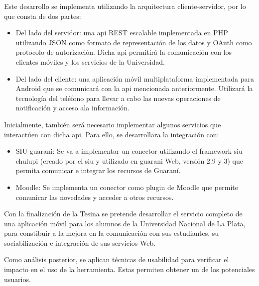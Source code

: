 Este desarrollo se implementa utilizando la arquitectura cliente-servidor, por lo que consta de dos partes:
\begin{itemize}
	\item Del lado del servidor: una \gls{api} REST escalable implementada en PHP utilizando JSON como formato de representación de los datos y OAuth como protocolo de autorización. Dicha \gls{api} permitirá la comunicación con los clientes móviles y los servicios de la Universidad.
	\item Del lado del cliente: una aplicación móvil multiplataforma implementada para Android que se comunicará con la \gls{api} mencionada anteriormente. Utilizará la tecnología del teléfono para llevar a cabo las nuevas operaciones de notificación y acceso ala información.
\end{itemize}

Inicialmente, también será necesario implementar algunos servicios que interactúen con dicha \gls{api}. Para ello, se desarrollara la integración con:
\begin{itemize}
	\item SIU \gls{guarani}: Se va a implementar un conector utilizando el framework \gls{siu} \gls{chulupi} (creado por el \gls{siu} y utilizado en \gls{guarani} Web, versión 2.9 y 3) que permita comunicar e integrar los recursos de Guaraní.
	\item Moodle: Se implementa un conector como plugin de Moodle que permite comunicar las novedades y acceder a otros recursos.
\end{itemize}

Con la finalización de la Tesina se pretende desarrollar el servicio completo de una aplicación móvil para los alumnos de la Universidad Nacional de La Plata, para constibuir a la mejora en la comunicación con sus estudiantes, su sociabilización e integración de sus servicios Web.

Como análisis posterior, se aplican técnicas de usabilidad para verificar el impacto en el uso de la herramienta. Estas permiten obtener un  de los potenciales usuarios.
